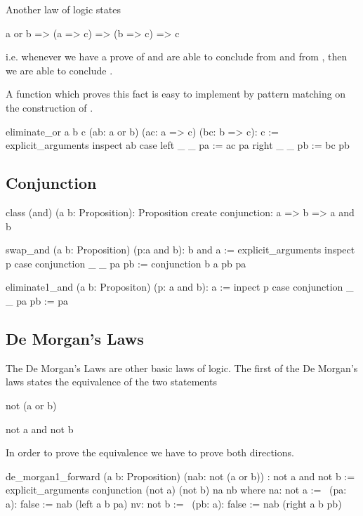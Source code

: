 Another law of logic states
\begin{alba}
  a or b  =>  (a => c) => (b => c)  =>  c
\end{alba}
%
i.e. whenever we have a prove of  and are able to conclude
 from  and  from , then we are able to
conclude .

A function which proves this fact is easy to implement by pattern matching on
the construction of .

\begin{alba}
  eliminate_or a b c (ab: a or b) (ac: a => c) (bc: b => c): c :=
    explicit_arguments
      inspect
        ab
      case
        left  _ _ pa :=
          ac pa
        right _ _ pb :=
          bc pb
\end{alba}


\subsection{Conjunction}

\begin{alba}
  class
    (and) (a b: Proposition): Proposition
  create
    conjunction: a => b => a and b
\end{alba}


\begin{alba}
  swap_and (a b: Proposition) (p:a and b): b and a :=
    explicit_arguments
      inspect
        p
      case
        conjunction _ _ pa pb := conjunction b a pb pa
\end{alba}


\begin{alba}
  eliminate1_and (a b: Propositon) (p: a and b): a :=
    inpect p case
      conjunction _ _ pa pb := pa
\end{alba}



\subsection{De Morgan's Laws}

The De Morgan's Laws are other basic laws of logic. The first of the De
Morgan's laws states the equivalence of the two statements
\begin{alba}
  not (a or b)

  not a and not b
\end{alba}
%
In order to prove the equivalence we have to prove both directions.
\begin{alba}
  de_morgan1_forward
    (a b: Proposition)
    (nab: not (a or b))
    : not a and not b :=
      explicit_arguments
        conjunction (not a) (not b) na nb where
          na: not a :=
             \ (pa: a): false :=
                nab (left a b pa)
          nv: not b :=
             \ (pb: a): false :=
                nab (right a b pb)
\end{alba}

